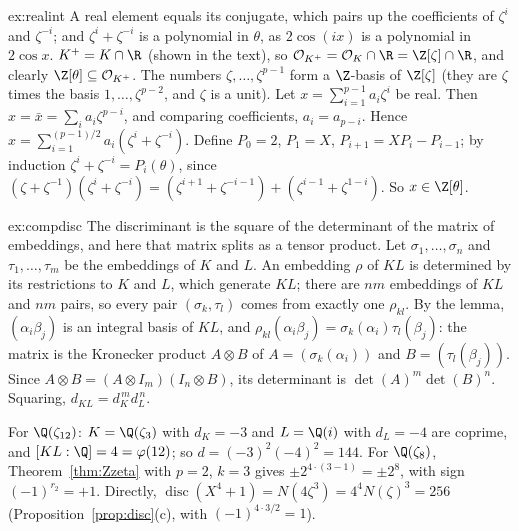 \begin{solution}{ex:realint}
\idea A real element equals its conjugate, which pairs up the coefficients of $\zeta^i$ and $\zeta^{-i}$; and
$\zeta^i+\zeta^{-i}$ is a polynomial in $\theta$, as $2\cos(ix)$ is a polynomial in $2\cos x$.
\writeup $K^+=K\cap\R$ (shown in the text), so $\mathcal O_{K^+}=\mathcal O_K\cap\R=\Z[\zeta]\cap\R$, and clearly $\Z[\theta]
\subseteq\mathcal O_{K^+}$. The numbers $\zeta,\dots,\zeta^{p-1}$ form a $\Z$-basis of $\Z[\zeta]$ (they are $\zeta$ times the basis
$1,\dots,\zeta^{p-2}$, and $\zeta$ is a unit). Let $x=\sum_{i=1}^{p-1}a_i\zeta^i$ be real. Then $x=\bar x=\sum_ia_i\zeta^{p-i}$, and
comparing coefficients, $a_i=a_{p-i}$. Hence $x=\sum_{i=1}^{(p-1)/2}a_i(\zeta^i+\zeta^{-i})$. Define $P_0=2$, $P_1=X$,
$P_{i+1}=XP_i-P_{i-1}$; by induction $\zeta^i+\zeta^{-i}=P_i(\theta)$, since $(\zeta+\zeta^{-1})(\zeta^i+\zeta^{-i})=(\zeta^{i+1}+
\zeta^{-i-1})+(\zeta^{i-1}+\zeta^{1-i})$. So $x\in\Z[\theta]$.
\end{solution}

\begin{solution}{ex:compdisc}
\idea The discriminant is the square of the determinant of the matrix of embeddings, and here that matrix splits as a tensor
product.
\writeup Let $\sigma_1,\dots,\sigma_n$ and $\tau_1,\dots,\tau_m$ be the embeddings of $K$ and $L$. An embedding $\rho$ of $KL$ is
determined by its restrictions to $K$ and $L$, which generate $KL$; there are $nm$ embeddings of $KL$ and $nm$ pairs, so every
pair $(\sigma_k,\tau_l)$ comes from exactly one $\rho_{kl}$. By the lemma, $(\alpha_i\beta_j)$ is an integral basis of $KL$, and
$\rho_{kl}(\alpha_i\beta_j)=\sigma_k(\alpha_i)\tau_l(\beta_j)$: the matrix is the Kronecker product $A\otimes B$ of
$A=(\sigma_k(\alpha_i))$ and $B=(\tau_l(\beta_j))$. Since $A\otimes B=(A\otimes I_m)(I_n\otimes B)$, its determinant is
$\det(A)^m\det(B)^n$. Squaring, $d_{KL}=d_K^{\,m}d_L^{\,n}$.

For $\Q(\zeta_{12})$: $K=\Q(\zeta_3)$ with $d_K=-3$ and $L=\Q(i)$ with $d_L=-4$ are coprime, and $[KL:\Q]=4=\varphi(12)$; so
$d=(-3)^2(-4)^2=144$. For $\Q(\zeta_8)$, Theorem~\ref{thm:Zzeta} with $p=2$, $k=3$ gives $\pm2^{4\cdot(3-1)}=\pm2^8$, with sign
$(-1)^{r_2}=+1$. Directly, $\operatorname{disc}(X^4+1)=N(4\zeta^3)=4^4N(\zeta)^3=256$ (Proposition~\ref{prop:disc}(c), with
$(-1)^{4\cdot3/2}=1$).
\end{solution}

